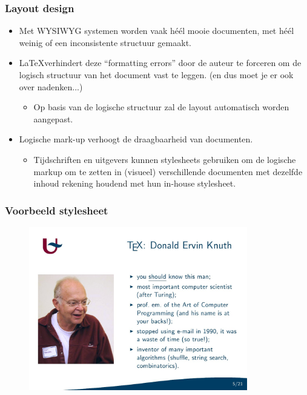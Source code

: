 \documentclass{beamer}
\begin{document}

\begin{frame}
\frametitle{Layout design}
\begin{itemize}
 \item <1->Met WYSIWYG systemen worden vaak h\'e\'el mooie documenten, met h\'e\'el weinig of een inconsistente structuur gemaakt.
 \item <2->\LaTeX verhindert deze ``formatting errors'' door de auteur te forceren om de logisch structuur van het document vast te leggen. (en dus moet je er ook over nadenken...)
 \begin{itemize}
  \item Op basis van de logische structuur zal de layout automatisch worden aangepast.
 \end{itemize}
 \item <3->Logische mark-up verhoogt de draagbaarheid van documenten.
 \begin{itemize}
  \item Tijdschriften en uitgevers kunnen stylesheets gebruiken om de logische markup om te zetten in (visueel) verschillende documenten met dezelfde inhoud rekening houdend met hun in-house stylesheet.
 \end{itemize}
 \end{itemize}
\end{frame}


\begin{frame}
\frametitle{Voorbeeld stylesheet}
\begin{figure}[hb] 
  \includegraphics[width=0.85\textwidth]{images/knuth.jpeg}
\end{figure}
\end{frame}
\end{document}
